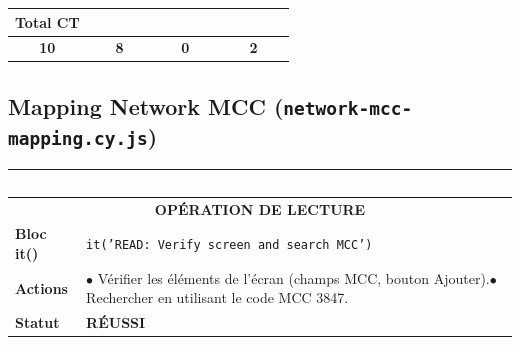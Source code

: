 \begin{center}
\renewcommand{\arraystretch}{1.5}
\begin{tabular}{|c|c|c|c|}
\hline
\textbf{Total CT} & \cellcolor{successbg}\textcolor{white}{\textbf{Réussis}} & \cellcolor{warningbg}\textcolor{white}{\textbf{Ignorés}} & \cellcolor{dangerbg}\textcolor{white}{\textbf{Échoués}} \\
\hline
\textbf{10} & \textcolor{successbg}{\textbf{8}} & \textcolor{warningbg}{\textbf{0}} & \textcolor{dangerbg}{\textbf{2}} \\
\hline
\end{tabular}
\end{center}

\subsection{Mapping Network MCC (\texttt{network-mcc-mapping.cy.js})}

\vspace{0.3cm}
\noindent
\begin{minipage}{\textwidth}
\renewcommand{\arraystretch}{1.5}
\begin{tabular}{|p{3cm}|p{12.5cm}|}
\hline
\rowcolor{primary}
\textcolor{white}{\textbf{Section}} & \textcolor{white}{\textbf{Détails}} \\
\hline
\multicolumn{2}{|c|}{\cellcolor{gray!20}\textbf{OPÉRATION DE LECTURE}} \\
\hline
\textbf{Bloc it()} & \texttt{it('READ: Verify screen and search MCC')} \\
\hline
\textbf{Actions} & $\bullet$ Vérifier les éléments de l'écran (champs MCC, bouton Ajouter).\newline $\bullet$ Rechercher en utilisant le code MCC 3847. \\
\hline
\textbf{Statut} & \textcolor{success}{\textbf{RÉUSSI}} \\
\hline
\end{tabular}
\end{minipage}

